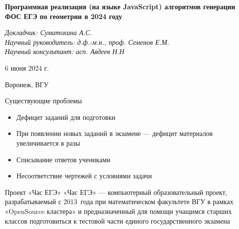 \documentclass[aspectratio=169,12pt]{beamer}
\begin{document}
\begin{frame}
	\begin{center}
		\vspace{1cm}
		\Large\textcolor{NordBrightBlue}{\textbf{Программная реализация (на языке JavaScript) алгоритмов генерации ФОС ЕГЭ по геометрии в 2024 году}}\\
	\end{center}
	\vspace{0.5cm}
	\large\textcolor{NordBlue}{\textit{Докладчик: Суматохина А.С.}}\\
	\large\textcolor{NordBlue}{\textit{Научный руководитель: д.ф.-м.н., проф. Семенов Е.М.}}\\
	\large\textcolor{NordBlue}{\textit{Научный консультант: асп. Авдеев Н.Н}}\\
	\vspace{0.5cm}
	\begin{center}
		6 июня 2024 г.
	\end{center}
	\begin{center}
		Воронеж, ВГУ
	\end{center}

\end{frame}

\begin{frame}{Существующие проблемы}
	\begin{itemize}
		\item Дефицит заданий для подготовки
		\item При появлении новых заданий в экзамене — дефицит материалов увеличивается в разы
		\item Списывание ответов учениками
		\item Несоответствие чертежей с условиями задачи
	\end{itemize}
\end{frame}

\begin{frame}{Проект «Час ЕГЭ»}
	\large
	«Час ЕГЭ» — компьютерный образовательный проект, разрабатываемый с 2013~года при математическом факультете ВГУ в рамках «OpenSource кластера» и предназначенный для помощи учащимся старших классов подготовиться к тестовой части единого государственного экзамена
\end{frame}
\end{document}
